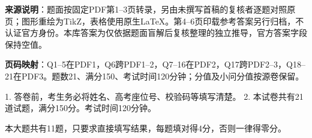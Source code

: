 

\begin{gktip}
\textbf{来源说明}：题面按固定PDF第1–3页转录，另由未撰写首稿的复核者逐题对照原页；图形重绘为TikZ，表格使用原生LaTeX。第4–6页印载参考答案另行归档，不认证官方身份。本库答案为仅依据题面盲解后复核整理的独立推导，官方答案字段保持空值。

\textbf{页码映射}：Q1–5在PDF1，Q6跨PDF1–2，Q7–16在PDF2，Q17跨PDF2–3，Q18–21在PDF3。题数21、满分150、考试时间120分钟；分值及小问分值按源卷保留。
\end{gktip}


1. 答卷前，考生务必将姓名、高考座位号、校验码等填写清楚。
2. 本试卷共有21道试题，满分150分。考试时间120分钟。


本大题共有11题，只要求直接填写结果，每题填对得4分，否则一律得零分。

